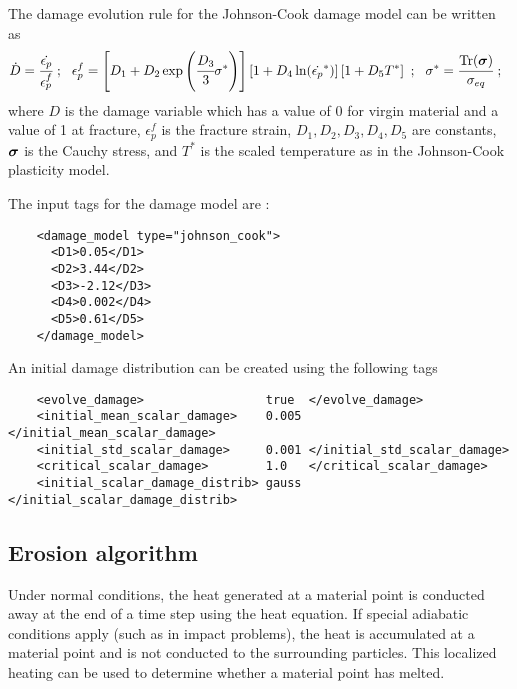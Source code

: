   The damage evolution rule for the Johnson-Cook damage model can be written as
  \begin{equation}
    \dot{D} = \cfrac{\dot{\epsilon_p}}{\epsilon_p^f} ~;~~
    \epsilon_p^f = 
      \left[D_1 + D_2 \exp \left(\cfrac{D_3}{3} \sigma^*\right)\right]
      \left[1+ D_4 \ln(\dot{\epsilon_p}^*)\right]
      \left[1+D_5 T^*\right]~;~~
    \sigma^*= \cfrac{\text{Tr}(\boldsymbol{\sigma})}{\sigma_{eq}}~;~~
  \end{equation}
  where $D$ is the damage variable which has a value of 0 for virgin material
  and a value of 1 at fracture, $\epsilon_p^f$ is the fracture strain, 
  $D_1, D_2, D_3, D_4, D_5$ are constants, $\boldsymbol{\sigma}$ is the Cauchy stress, and
  $T^*$ is the scaled temperature as in the Johnson-Cook plasticity model.

  The input tags for the damage model are :
  \lstset{language=XML}
  \begin{lstlisting}
    <damage_model type="johnson_cook">
      <D1>0.05</D1>
      <D2>3.44</D2>
      <D3>-2.12</D3>
      <D4>0.002</D4>
      <D5>0.61</D5>
    </damage_model>
  \end{lstlisting}

  An initial damage distribution can be created using the following tags
  \lstset{language=XML}
  \begin{lstlisting}
    <evolve_damage>                 true  </evolve_damage>
    <initial_mean_scalar_damage>    0.005  </initial_mean_scalar_damage>
    <initial_std_scalar_damage>     0.001 </initial_std_scalar_damage>
    <critical_scalar_damage>        1.0   </critical_scalar_damage>
    <initial_scalar_damage_distrib> gauss </initial_scalar_damage_distrib>
  \end{lstlisting}

  \subsection{Erosion algorithm}
  Under normal conditions, the heat generated at a material point is conducted 
  away at the end of a time step using the heat equation.  If special adiabatic 
  conditions apply (such as in impact problems), the heat is accumulated at a 
  material point and is not conducted to the surrounding particles.  This 
  localized heating can be used to determine whether a material point has
  melted.

